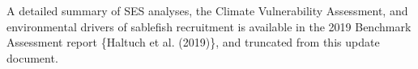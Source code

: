 \documentclass[11pt,
  english,
  a4paper,
]{article}
\begin{document}
\leavevmode\tagmcend\tagstructend\par


A detailed summary of SES analyses, the Climate Vulnerability Assessment, and environmental drivers of sablefish recruitment is available in the 2019 Benchmark Assessment report \{{Haltuch et al. (2019)\leavevmode\tagmcend\tagstructend}\}, and truncated from this update document.

\leavevmode\tagmcend\tagstructend\par

\end{document}
